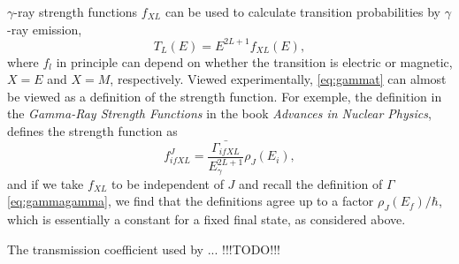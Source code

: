 $\gamma$-ray strength functions $f_{XL}$ can be used to calculate transition probabilities by $\gamma$-ray emission, 
\begin{equation}
T_L(E) = E^{2L+1} f_{XL}(E),\label{eq:gammat}
\end{equation}
where $f_l$ in principle can depend on whether the transition is electric or magnetic, $X=E$ and $X=M$, respectively. Viewed experimentally, \eqref{eq:gammat} can almost be viewed as a definition of the strength function. For exemple, the definition in the \emph{Gamma-Ray Strength Functions} in the book \emph{Advances in Nuclear Physics}\cite{ainp:1973}, defines the strength function as
\begin{equation}
f_{ifXL}^J = \frac{\bar{\Gamma_{ifXL}}}{E^{2L+1}_\gamma}\rho_{J}(E_i),
\end{equation}
and if we take $f_{XL}$ to be independent of $J$ and recall the definition of $\Gamma$ \eqref{eq:gammagamma}, we find that the definitions agree up to a factor $\rho_J(E_f)/\hbar$, which is essentially a constant for a fixed final state, as considered above.

The transmission coefficient used by  ... !!!TODO!!!

